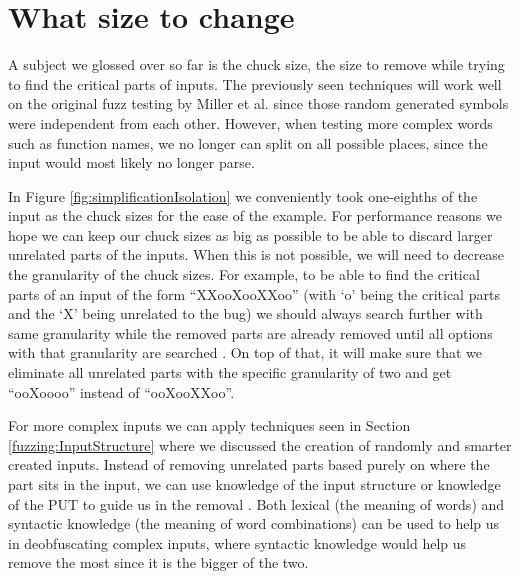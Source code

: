 \section{What size to change}
\label{inputReduction:Chucksize}
A subject we glossed over so far is the chuck size, the size to remove while trying to find the critical parts of inputs. 
The previously seen techniques will work well on the original fuzz testing by Miller et al. \cite{4originalFuzzingUnixUtils} since those random generated symbols were independent from each other. However, when testing more complex words such as function names, we no longer can split on all possible places, since the input would most likely no longer parse. 

In Figure \ref{fig:simplificationIsolation} we conveniently took one-eighths of the input as the chuck sizes for the ease of the example. For performance reasons we hope we can keep our chuck sizes as big as possible to be able to discard larger unrelated parts of the inputs. When this is not possible, we will need to decrease the granularity of the chuck sizes.
For example, to be able to find the critical parts of an input of the form “XXooXooXXoo” (with ‘o’ being the critical parts and the ‘X’ being unrelated to the bug) we should always search further with same granularity while the removed parts are already removed until all options with that granularity are searched \cite{bookZellerwhyProgramsFail}. On top of that, it will make sure that we eliminate all unrelated parts with the specific granularity of two and get “ooXoooo” instead of “ooXooXXoo”. 

For more complex inputs we can apply techniques seen in Section \ref{fuzzing:InputStructure} where we discussed the creation of randomly and smarter created inputs. Instead of removing unrelated parts based purely on where the part sits in the input, we can use knowledge of the input structure or knowledge of the PUT to guide us in the removal \cite{bookZellerwhyProgramsFail}. Both lexical (the meaning of words) and syntactic knowledge (the meaning of word combinations) can be used to help us in deobfuscating complex inputs, where syntactic knowledge would help us remove the most since it is the bigger of the two.

